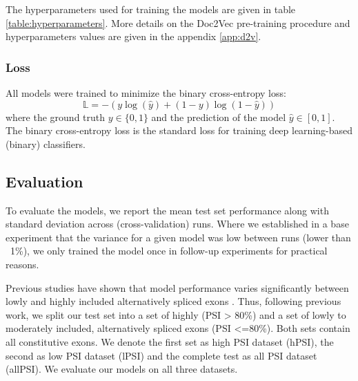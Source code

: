 The hyperparameters used for training the models are given in table \ref{table:hyperparameters}. More details on the Doc2Vec pre-training procedure and hyperparameters values are given in the appendix \ref{app:d2v}.

\subsubsection{Loss}  \label{subsubsec:loss}
All models were trained to minimize the binary cross-entropy loss:
$$\mathbb{L} = - (y \log(\hat{y}) + (1 - y) \log (1 - \hat{y}))$$
where the ground truth $y \in \{0, 1\}$ and the prediction of the model $\hat{y} \in [0, 1]$. The binary cross-entropy loss is the standard loss for training deep learning-based (binary) classifiers.

\subsection{Evaluation}

To evaluate the models, we report the mean test set performance along with standard deviation across (cross-validation) runs. 
Where we established in a base experiment that the variance for a given model was low between runs (lower than ~1\%), we only trained the model once in follow-up experiments for practical reasons.

Previous studies have shown that model performance varies significantly between lowly and highly included alternatively spliced exons \cite{dsc} \cite{buschhertel}. Thus, following previous work, we split our test set into a set of highly (PSI > 80\%) and a set of lowly to moderately included, alternatively spliced exons (PSI <=80\%). Both sets contain all constitutive exons. We denote the first set as high PSI dataset (hPSI), the second as low PSI dataset (lPSI) and the complete test as all PSI dataset (allPSI). We evaluate our models on all three datasets.


